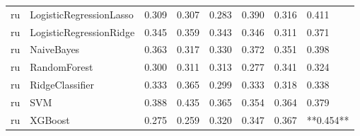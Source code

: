 \begin{tabular}{llllllll}
      ru &      LogisticRegressionLasso & 0.309 &                     0.307 &                 0.283 &                  0.390 &                                   0.316 &     0.411 \\
      ru &      LogisticRegressionRidge & 0.345 &                     0.359 &                 0.343 &                  0.346 &                                   0.311 &     0.371 \\
      ru &                   NaiveBayes & 0.363 &                     0.317 &                 0.330 &                  0.372 &                                   0.351 &     0.398 \\
      ru &                 RandomForest & 0.300 &                     0.311 &                 0.313 &                  0.277 &                                   0.341 &     0.324 \\
      ru &              RidgeClassifier & 0.333 &                     0.365 &                 0.299 &                  0.333 &                                   0.318 &     0.338 \\
      ru &                          SVM & 0.388 &                     0.435 &                 0.365 &                  0.354 &                                   0.364 &     0.379 \\
      ru &                      XGBoost & 0.275 &                     0.259 &                 0.320 &                  0.347 &                                   0.367 & **0.454** \\
\bottomrule
\end{tabular}
